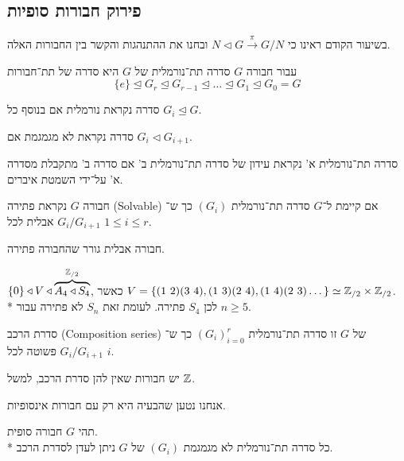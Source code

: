 \subsection{פירוק חבורות סופיות}
בשיעור הקודם ראינו כי $N \triangleleft G \xrightarrow{\pi} G / N$ ובחנו את ההתנהגות והקשר בין החבורות האלה.
\begin{definition}
	עבור חבורה $G$ סדרה תת־נורמלית של $G$ היא סדרה של תת־חבורות
	\[
		\{e\} \trianglelefteq G_r \trianglelefteq G_{r - 1} \trianglelefteq \dots \trianglelefteq G_1 \trianglelefteq G_0 = G
	\]
\end{definition}
\begin{remark}
	סדרה נקראת נורמלית אם בנוסף כל $G_i \trianglelefteq G$.
\end{remark}
\begin{remark}
	סדרה נקראת לא מגמגמת אם $G_i \triangleleft G_{i + 1}$.
\end{remark}
\begin{remark}
	סדרה תת־נורמלית א' נקראת עידון של סדרה תת־נורמלית ב' אם סדרה ב' מתקבלת מסדרה א' על־ידי השמטת איברים.
\end{remark}
\begin{definition}
	חבורה $G$ נקראת פתירה (Solvable) אם קיימת ל־$G$ סדרה תת־נורמלית $(G_i)$ כך ש־$G_i / G_{i + 1}$ אבלית לכל $1 \le i \le r$.
\end{definition}
חבורה אבלית גורר שהחבורה פתירה.
\begin{example}
	$\{0\} \triangleleft V \triangleleft \overbrace{A_4 \triangleleft S_4}^{\mathbb{Z}_{/2}}$, כאשר $V = \{ (1\ 2)(3\ 4), (1\ 3)(2\ 4), (1\ 4)(2\ 3) \dots \} \simeq \mathbb{Z}_{/2} \times \mathbb{Z}_{/2}$. \\*
	לכן $S_4$ פתירה. לעומת זאת $S_n$ לא פתירה עבור $n \ge 5$.
\end{example}
\begin{definition}
	סדרת הרכב (Composition series) של $G$ זו סדרה תת־נורמלית ${(G_i)}_{i = 0}^r$ כך ש־$G_i / G_{i + 1}$ פשוטה לכל $i$.
\end{definition}
\begin{remark}
	יש חבורות שאין להן סדרת הרכב, למשל $\mathbb{Z}$.
\end{remark}
אנחנו נטען שהבעיה היא רק עם חבורות אינסופיות.
\begin{proposition}
	תהי $G$ חבורה סופית. \\*
	כל סדרה תת־נורמלית לא מגמגמת $(G_i)$ של $G$ ניתן לעדן לסדרת הרכב.
\end{proposition}

